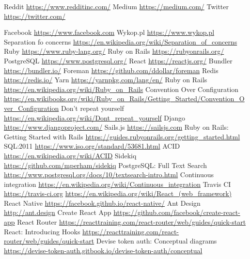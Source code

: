 \documentclass[declaration,shortabstract,polish,inz]{iithesis}
\begin{document}
\begin{thebibliography}{99}
 Reddit
\url{https://www.redditinc.com/}
 Medium
\url{https://medium.com/}
 Twitter
\url{https://twitter.com/}

 Facebook
\url{https://www.facebook.com}
 Wykop.pl 
\url{https://www.wykop.pl}
 Separation fo concerns
\url{https://en.wikipedia.org/wiki/Separation_of_concerns}
 Ruby
\url{https://www.ruby-lang.org/}
 Ruby on Rails
\url{https://rubyonrails.org/}
 PostgreSQL
\url{https://www.postgresql.org/}
 React
\url{https://reactjs.org/}
 Bundler
\url{https://bundler.io/}
 Foreman
\url{https://github.com/ddollar/foreman}
 Redis
\url{https://redis.io/}
 Yarn
\url{https://yarnpkg.com/lang/en/}
 Ruby on Rails
\url{https://en.wikipedia.org/wiki/Ruby_on_Rails}
 Convention Over Configuration
\url{https://en.wikibooks.org/wiki/Ruby_on_Rails/Getting_Started/Convention_Over_Configuration}
 Don't repeat yourself
\url{https://en.wikipedia.org/wiki/Dont_repeat_yourself}
 Django
\url{https://www.djangoproject.com/}
 Sails.js
\url{https://sailsjs.com}
 Ruby on Rails: 
Getting Started with Rails
\url{https://guides.rubyonrails.org/getting_started.html}
 SQL:2011 
\url{https://www.iso.org/standard/53681.html}
 ACID
\url{https://en.wikipedia.org/wiki/ACID}
 Sidekiq
\url{https://github.com/mperham/sidekiq}
 PostgreSQL: Full Text Search
\url{https://www.postgresql.org/docs/10/textsearch-intro.html}
 Continuous integration
\url{https://en.wikipedia.org/wiki/Continuous_integration}
 Travis CI
\url{https://travis-ci.org}
\url{https://en.wikipedia.org/wiki/React_(web_framework)}
 React Native
\url{https://facebook.github.io/react-native/}
 Ant Design
\url{http://ant.design}
 Create React App
\url{https://github.com/facebook/create-react-app}
 React Router
\url{https://reacttraining.com/react-router/web/guides/quick-start}
 React: Introducing Hooks
\url{https://reacttraining.com/react-router/web/guides/quick-start}
 Devise token auth: Conceptual diagrams
\url{https://devise-token-auth.gitbook.io/devise-token-auth/conceptual}

\end{thebibliography}
\end{document}
